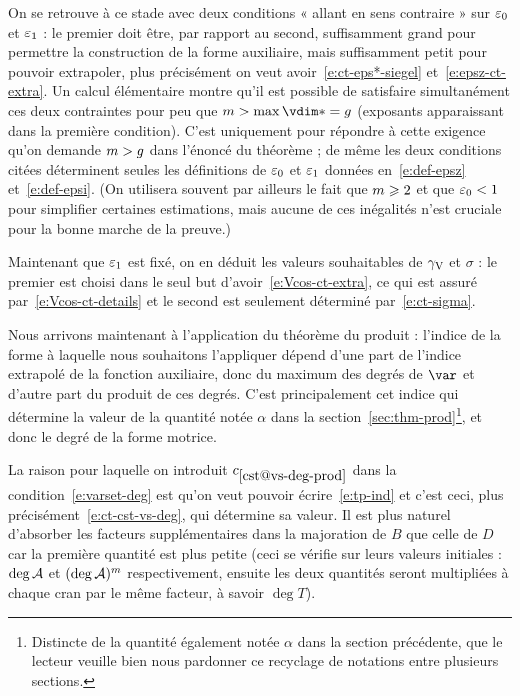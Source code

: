 On se retrouve à ce stade avec deux conditions « allant en sens contraire »
sur \( \varepsilon\sb0 \) et \( \varepsilon\sb1 \) : le premier doit être, par rapport au second,
suffisamment grand pour permettre la construction de la forme auxiliaire, mais
suffisamment petit pour pouvoir extrapoler, plus précisément on veut
avoir~\eqref{e:ct-eps*-siegel} et~\eqref{e:epsz-ct-extra}. Un calcul
élémentaire montre qu'il est possible de satisfaire simultanément ces deux
contraintes pour peu que \( \puiss > \max \vdim* = \genre \) (exposants
apparaissant dans la première condition).  C'est uniquement pour répondre à
cette exigence qu'on demande \( m > g \) dans l'énoncé du théorème ;
de même les deux conditions citées déterminent seules les définitions de \(
  \varepsilon\sb0 \) et \( \varepsilon\sb1 \) données en~\eqref{e:def-epsz} et~\eqref{e:def-epsi}.
(On utilisera souvent par ailleurs le fait que \( m \geqslant 2 \) et que \(
  \varepsilon\sb0 < 1 \) pour simplifier certaines estimations, mais aucune de ces
inégalités n'est cruciale pour la bonne marche de la preuve.)

Maintenant que \( \varepsilon\sb1 \) est fixé, on en déduit les valeurs souhaitables de
\( \gamma \sb{\mathrm{V}} \) et \( \sigma \) : le premier est choisi dans le seul but
d'avoir~\eqref{e:Vcos-ct-extra}, ce qui est assuré
par~\eqref{e:Vcos-ct-details} et le second est seulement déterminé
par~\eqref{e:ct-sigma}.

Nous arrivons maintenant à l'application du théorème du produit : l'indice de
la forme à laquelle nous souhaitons l'appliquer dépend d'une part de l'indice
extrapolé de la fonction auxiliaire, donc du maximum des degrés de \( \var \)
et d'autre part du produit de ces degrés. C'est principalement cet indice qui
détermine la valeur de la quantité notée \( \alpha \) dans la
section~\ref{sec:thm-prod}\footnote{Distincte de la quantité également notée
  \( \alpha \) dans la section précédente, que le lecteur veuille bien nous
  pardonner ce recyclage de notations entre plusieurs sections.}, et donc le
degré de la forme motrice.

La raison pour laquelle on introduit \( \cst{vs-deg-prod} \) dans la
condition~\eqref{e:varset-deg} est qu'on veut pouvoir écrire~\eqref{e:tp-ind}
et c'est ceci, plus précisément~\eqref{e:ct-cst-vs-deg}, qui détermine
sa valeur. Il est plus naturel d'absorber
les facteurs supplémentaires dans la majoration de \( B \) que celle de \( D
\) car la première quantité est  plus petite (ceci se vérifie
sur leurs valeurs initiales : \( \deg \mathcal A \) et \( (\deg \mathcal A)^m \)
respectivement, ensuite les deux quantités seront multipliées à chaque cran
par le même facteur, à savoir \( \deg T \)).

